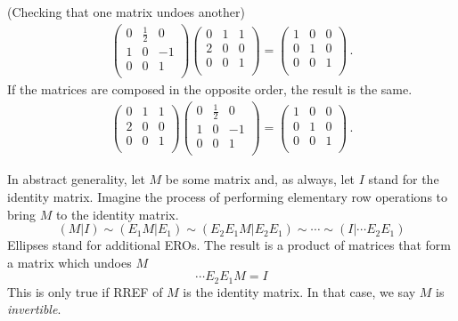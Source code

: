 \begin{example} (Checking that \hypertarget{inversie}{one matrix undoes another})
\begin{eqnarray*}
\left(\begin{array}{ccc}
0&\frac12&0\\
1 &0 &-1\\ 
0  &0 &1\\
\end{array}  \right)
\left(\begin{array}{ccc}
0&1&1\\
2 &0 &0\\ 
0  &0 &1\\
\end{array}  \right)
=
\left(\begin{array}{ccc}
1  &0 &0\\
0  &1 &0\\ 
0  &0 &1\\
\end{array}  \right) \, .
\end{eqnarray*}
If the matrices are composed in the opposite order, the result is the same.
\begin{eqnarray*}
\left(\begin{array}{ccc}
0&1&1\\
2 &0 &0\\ 
0  &0 &1\\
\end{array}  \right)
\left(\begin{array}{ccc}
0&\frac12&0\\
1 &0 &-1\\ 
0  &0 &1\\
\end{array}  \right)
=
\left(\begin{array}{ccc}
1  &0 &0\\
0  &1 &0\\ 
0  &0 &1\\
\end{array}  \right) \, .
\end{eqnarray*}
\end{example}



In abstract generality, let $M$ be some matrix and, as always, let $I$ stand for the identity matrix. Imagine the process of performing elementary row operations to bring $M$ to the identity matrix. 
\begin{equation*}
(M | I) \sim ( E_1M| E_1)\sim (E_2E_1 M | E_2 E_1) \sim \cdots \sim (I | \cdots E_2E_1 )
\end{equation*}
Ellipses stand for additional EROs. The result is a product of matrices that form a matrix which undoes $M$
\begin{equation*}
\cdots E_2 E_1 M =  I 
\end{equation*}
This is only true if RREF of $M$ is the identity matrix.  
In that case, we say $M$ is {\it invertible}. 


